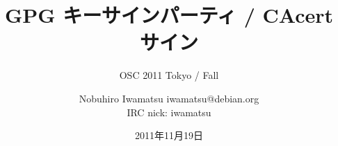 




\documentclass[cjk,dvipdfmx,12pt]{beamer}
\usepackage{monthlypresentation}



\title{GPG キーサインパーティ / CAcert サイン}
\subtitle{OSC 2011 Tokyo / Fall}
\author{Nobuhiro Iwamatsu iwamatsu@debian.org\\IRC nick: iwamatsu}
\date{2011年11月19日}




